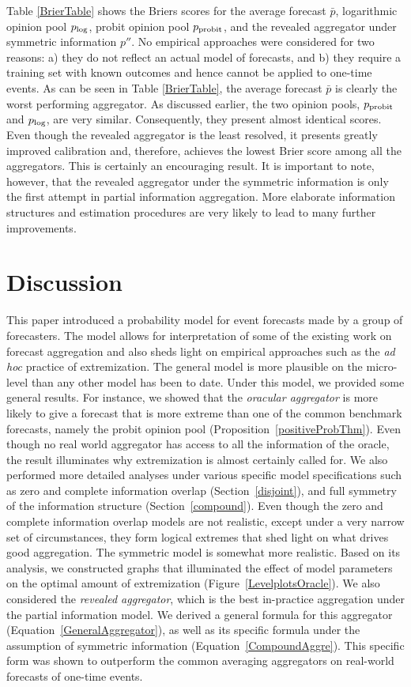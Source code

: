 \documentclass[11pt]{article}
\theoremstyle{definition}
\theoremstyle{definition}
\def\probit{p_{\rm probit}}
\def\plog{p_{\rm log}}
\begin{document}
Table \ref{BrierTable} shows the Briers scores for the average
forecast $\bar{p}$, logarithmic opinion pool $\plog$, probit opinion
pool $\probit$, and the revealed aggregator under symmetric
information $p''$. No empirical approaches were considered for two
reasons: a) they do not reflect an actual model of forecasts, and b)
they require a training set with known outcomes and hence cannot be
applied to one-time events. As can be seen in Table \ref{BrierTable},
the average forecast $\bar{p}$ is clearly the worst performing aggregator. As
discussed earlier, the two opinion pools, $\probit$ and $\plog$, are
very similar. Consequently, they present almost identical scores. Even
though the revealed aggregator is the least resolved, it presents
greatly improved calibration and, therefore, achieves the lowest Brier
score among all the aggregators. This is certainly an encouraging
result. It is important to note, however, that the revealed aggregator
under the symmetric information is only the first attempt in partial
information aggregation. More elaborate information structures and
estimation procedures are very likely to lead to many further
improvements.

\section{Discussion}
\label{discussion}
This paper introduced a probability model for event forecasts made by
a group of forecasters.  The model allows for interpretation of some
of the existing work on forecast aggregation and also sheds light on
empirical approaches such as the {\em ad hoc} practice of
extremization.  The general model is more plausible on the micro-level
than any other model has been to date. Under this model, we provided
some general results. For instance, we showed that the
\textit{oracular aggregator} is more likely to give a forecast that is
more extreme than one of the common benchmark forecasts, namely the
probit opinion pool (Proposition~\ref{positiveProbThm}).  Even though
no real world aggregator has access to all the information of the
oracle, the result illuminates why extremization is almost certainly
called for.  We also performed more detailed analyses under various
specific model specifications such as zero and complete information
overlap (Section~\ref{disjoint}), and full symmetry of the information
structure (Section~\ref{compound}).  Even though the zero and complete
information overlap models are not realistic, except under a very
narrow set of circumstances, they form logical extremes that shed
light on what drives good aggregation. The symmetric model is somewhat
more realistic.  Based on its analysis, we constructed graphs that
illuminated the effect of model parameters on the optimal amount of
extremization (Figure~\ref{LevelplotsOracle}).  We also considered the
{\em revealed aggregator}, which is the best in-practice aggregation
under the partial information model.  We derived a general formula for
this aggregator (Equation~\ref{GeneralAggregator}), as well as its
specific formula under the assumption of symmetric information
(Equation~\ref{CompoundAggre}). This specific form was shown to 
outperform the common averaging aggregators on real-world forecasts 
of one-time events. 
\end{document}
